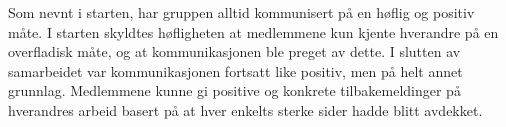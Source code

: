 Som nevnt i starten, har gruppen alltid kommunisert på en høflig og positiv måte. I starten skyldtes høfligheten at medlemmene kun kjente hverandre på en overfladisk måte, og at kommunikasjonen ble preget av dette. I slutten av samarbeidet var kommunikasjonen fortsatt like positiv, men på helt annet grunnlag. Medlemmene kunne gi positive og konkrete tilbakemeldinger på hverandres arbeid basert på at hver enkelts sterke sider hadde blitt avdekket. 
























